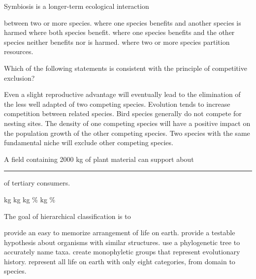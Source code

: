 \question
Symbiosis is a longer-term ecological interaction

\begin{choices}
\correctchoice between two or more species. %
\choice where one species benefits and another species is harmed %
\choice where both species benefit. %
\choice  where one species benefits and the other species neither benefits nor is harmed. %
\choice where two or more species partition resources. %
\end{choices}

\question
Which of the following statements is consistent with the principle of competitive exclusion?  

\begin{choices}
\correctchoice Even a slight reproductive advantage will eventually lead to the elimination of the less well adapted of two competing species. %
\choice Evolution tends to increase competition between related species.   %
\choice Bird species generally do not compete for nesting sites.  %
\choice The density of one competing species will have a positive impact on the population growth of the other competing species. %
\choice Two species with the same fundamental niche will exclude other competing species.   %
\end{choices}

\question
A field containing 2000 kg of plant material can support about \rule{1in}{0.4pt} of tertiary consumers.

\begin{choices}
 kg %
 kg %
 kg %
\% %
 kg %
\% %
\end{choices}

\question
The goal of hierarchical classification is to

\begin{choices}
\choice provide an easy to memorize arrangement of life on earth. %
\choice provide a testable hypothesis about organisms with similar structures. %
\choice use a phylogenetic tree to accurately name taxa. %
\correctchoice create monophyletic groups that represent evolutionary history. %
\choice represent all life on earth with only eight categories, from domain to species. %
\end{choices}


